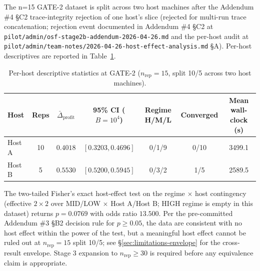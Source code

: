 The n=15 GATE-2 dataset is split across two host machines after the Addendum \#4 \S C2 trace-integrity rejection of one host's slice (rejected for multi-run trace concatenation; rejection event documented in Addendum \#4 \S C2 at \texttt{pilot/admin/osf-stage2b-addendum-2026-04-26.md} and the per-host audit at \texttt{pilot/admin/team-notes/2026-04-26-host-effect-analysis.md} \S A). Per-host descriptives are reported in Table~\ref{tab:host-descriptives}.

\begin{table}[h]
\centering
\caption{Per-host descriptive statistics at GATE-2 ($n_{\text{rep}} = 15$, split 10/5 across two host machines).}
\label{tab:host-descriptives}
\begin{tabular}{lcccccc}
\toprule
Host & Reps & $\bar{\Delta}_{\text{profit}}$ & 95\% CI ($B = 10^4$) & Regime H/M/L & Converged & Mean wall-clock (s) \\
\midrule
Host A & 10 & $0.4018$ & $[0.3203, 0.4696]$ & 0/1/9  & 0/10 & 3499.1 \\
Host B & 5  & $0.5530$ & $[0.5200, 0.5945]$ & 0/3/2  & 1/5  & 2589.5 \\
\bottomrule
\end{tabular}
\end{table}

The two-tailed Fisher's exact host-effect test on the regime $\times$ host contingency (effective $2 \times 2$ over MID/LOW $\times$ Host A/Host B; HIGH regime is empty in this dataset) returns $p = 0.0769$ with odds ratio $13.500$. Per the pre-committed Addendum \#3 \S B2 decision rule for $p \geq 0.05$, the data are consistent with no host effect within the power of the test, but a meaningful host effect cannot be ruled out at $n_{\text{rep}} = 15$ split 10/5; see \S\ref{sec:limitations-envelope} for the cross-result envelope. Stage 3 expansion to $n_{\text{rep}} \geq 30$ is required before any equivalence claim is appropriate.

